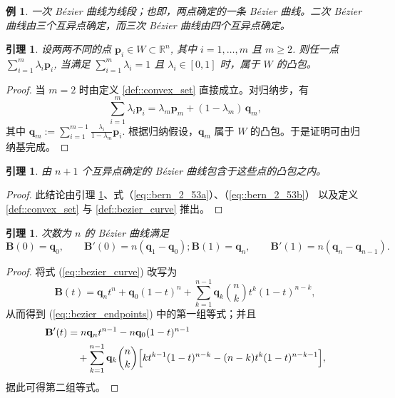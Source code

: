 \documentclass[a4paper]{ctexart}
\newtheorem{lemma}[theorem]{引理}
\newtheorem{example}[theorem]{例}
\numberwithin{theorem}{section}
\numberwithin{equation}{section}
\numberwithin{figure}{section}
\numberwithin{remark}{section}
\begin{document}
\begin{example}
一次 Bézier 曲线为线段；也即，两点确定的一条 Bézier 曲线。二次 Bézier 曲线由三个互异点确定，而三次 Bézier 曲线由四个互异点确定。
\end{example}

\begin{lemma}
    \label{lem::convex_combination}
设两两不同的点 $\mathbf{p}_i\in W\subset\mathbb{R}^n$, 其中 $i=1,\ldots,m$ 且 $m\ge 2$. 
则任一点 $\sum_{i=1}^{m}\lambda_i \mathbf{p}_i$, 
当满足 $\sum_{i=1}^{m}\lambda_i=1$ 且 $\lambda_i\in[0,1]$ 时，属于 $W$ 的凸包。
\end{lemma}

\begin{proof}
当 $m=2$ 时由定义 \ref{def::convex_set} 直接成立。对归纳步，有
\begin{equation*}
\sum_{i=1}^{m}\lambda_i \mathbf{p}_i=\lambda_m \mathbf{p}_m+(1-\lambda_m)\,\mathbf{q}_m,
\end{equation*}
其中 $\mathbf{q}_m:=\sum_{i=1}^{m-1}\frac{\lambda_i}{1-\lambda_m}\mathbf{p}_i$. 
根据归纳假设，$\mathbf{q}_m$ 属于 $W$ 的凸包。于是证明可由归纳基完成。
\end{proof}

\begin{lemma}
由 $n+1$ 个互异点确定的 Bézier 曲线包含于这些点的凸包之内。
\end{lemma}

\begin{proof}
此结论由引理 \ref{lem::convex_combination}、式（\ref{eq::bern_2_53a}）、（\ref{eq::bern_2_53b}）
以及定义 \ref{def::convex_set} 与 \ref{def::bezier_curve} 推出。
\end{proof}

\begin{lemma}
    \label{lem::bezier_endpoints}
次数为 $n$ 的 Bézier 曲线满足
\begin{subequations}
    \label{eq::bezier_endpoints}
\begin{equation}
\mathbf{B}(0)=\mathbf{q}_0,\qquad \mathbf{B}'(0)=n(\mathbf{q}_1-\mathbf{q}_0);
\end{equation}
\begin{equation}
\mathbf{B}(1)=\mathbf{q}_n,\qquad \mathbf{B}'(1)=n(\mathbf{q}_n-\mathbf{q}_{n-1}).
\end{equation}
\end{subequations}
\end{lemma}

\begin{proof}
将式 (\ref{eq::bezier_curve}) 改写为
\begin{equation*}
\mathbf{B}(t)=\mathbf{q}_n t^{n}+\mathbf{q}_0(1-t)^{n}+\sum_{k=1}^{n-1}\mathbf{q}_k \binom{n}{k} t^{k}(1-t)^{n-k},
\end{equation*}
从而得到 (\ref{eq::bezier_endpoints}) 中的第一组等式；并且
\begin{align*}
\mathbf{B}'(t)
&=n\mathbf{q}_n t^{n-1}-n\mathbf{q}_0(1-t)^{n-1} \nonumber\\
&\quad+\sum_{k=1}^{n-1}\mathbf{q}_k \binom{n}{k}\Bigl[k t^{k-1}(1-t)^{n-k}-(n-k)t^{k}(1-t)^{n-k-1}\Bigr],
\end{align*}
据此可得第二组等式。
\end{proof}
\end{document}
